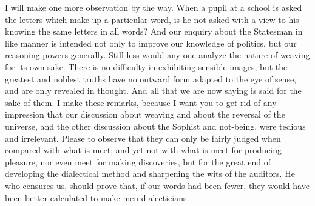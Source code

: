 \documentclass[11pt,letter]{article}
\begin{document}
\par  I will make one more observation by the way. When a pupil at a school is asked the letters which make up a particular word, is he not asked with a view to his knowing the same letters in all words? And our enquiry about the Statesman in like manner is intended not only to improve our knowledge of politics, but our reasoning powers generally. Still less would any one analyze the nature of weaving for its own sake. There is no difficulty in exhibiting sensible images, but the greatest and noblest truths have no outward form adapted to the eye of sense, and are only revealed in thought. And all that we are now saying is said for the sake of them. I make these remarks, because I want you to get rid of any impression that our discussion about weaving and about the reversal of the universe, and the other discussion about the Sophist and not-being, were tedious and irrelevant. Please to observe that they can only be fairly judged when compared with what is meet; and yet not with what is meet for producing pleasure, nor even meet for making discoveries, but for the great end of developing the dialectical method and sharpening the wits of the auditors. He who censures us, should prove that, if our words had been fewer, they would have been better calculated to make men dialecticians.
\end{document}
